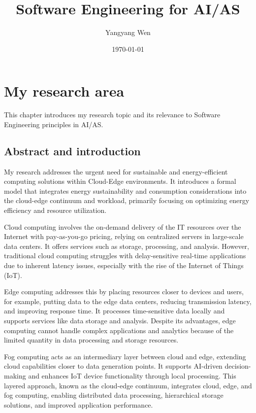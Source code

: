 \documentclass[11pt]{report}
\title{Software Engineering for AI/AS}
\author{Yangyang Wen}
\date{\today}
\begin{document}
\maketitle

\tableofcontents

\chapter{My research area}
\label{chap:intro}

This chapter introduces my research topic and its relevance to Software Engineering principles in AI/AS.
\section{Abstract and introduction}
My research addresses the urgent need for sustainable and energy-efficient computing solutions within Cloud-Edge environments. It introduces a formal model that integrates energy sustainability and consumption considerations into the cloud-edge continuum and workload, primarily focusing on optimizing energy efficiency and resource utilization.

Cloud computing involves the on-demand delivery of the IT resources over the Internet with pay-as-you-go pricing, relying on centralized servers in large-scale data centers. It offers services such as storage, processing, and analysis. However, traditional cloud computing struggles with delay-sensitive real-time applications due to inherent latency issues, especially with the rise of the Internet of Things (IoT).

Edge computing addresses this by placing resources closer to devices and users, for example, putting data to the edge data centers, reducing transmission latency, and improving response time. It processes time-sensitive data locally and supports services like data storage and analysis. Despite its advantages, edge computing cannot handle complex applications and analytics because of the limited quantity in data processing and storage resources. 

Fog computing acts as an intermediary layer between cloud and edge, extending cloud capabilities closer to data generation points. It supports AI-driven decision-making and enhances IoT device functionality through local processing. This layered approach, known as the cloud-edge continuum, integrates cloud, edge, and fog computing, enabling distributed data processing, hierarchical storage solutions, and improved application performance.
\end{document}
